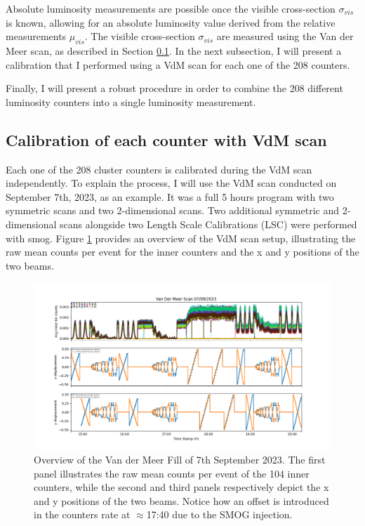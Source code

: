 Absolute luminosity measurements are possible once the visible cross-section $\sigma_{vis}$ is known, allowing for an absolute luminosity value derived from the relative measurements $\mu_{vis}$. The visible cross-section $\sigma_{vis}$ are measured using the Van der Meer scan, as described in Section \ref{sec:calibration_vdm}. In the next subsection, I will present a calibration that I performed using a VdM scan for each one of the 208 counters.

Finally, I will present a robust procedure in order to combine the 208 different luminosity counters into a single luminosity measurement.

\subsection{Calibration of each counter with VdM scan}\label{sec:calibration_vdm}
Each one of the 208 cluster counters is calibrated during the VdM scan independently. To explain the process, I will use the VdM scan conducted on September 7th, 2023, as an example.
It was a full 5 hours program with two symmetric scans and two 2-dimensional scans. Two additional symmetric and 2-dimensional scans alongside two Length Scale Calibrations (LSC) were performed with smog. Figure \ref{fig:inner_vdm_sep} provides an overview of the VdM scan setup, illustrating the raw mean counts per event for the inner counters and the x and y positions of the two beams.

\begin{figure}
    \centering
    \includegraphics[width=\textwidth]{figures/inner_counts_bkg.png}
    \caption{Overview of the Van der Meer Fill of 7th September 2023. The first panel illustrates the raw mean counts per event of the 104 inner counters, while the second and third panels respectively depict the x and y positions of the two beams. Notice how an offset is introduced in the counters rate at $\approx$17:40 due to the SMOG injection.}
    \label{fig:inner_vdm_sep}
\end{figure}


